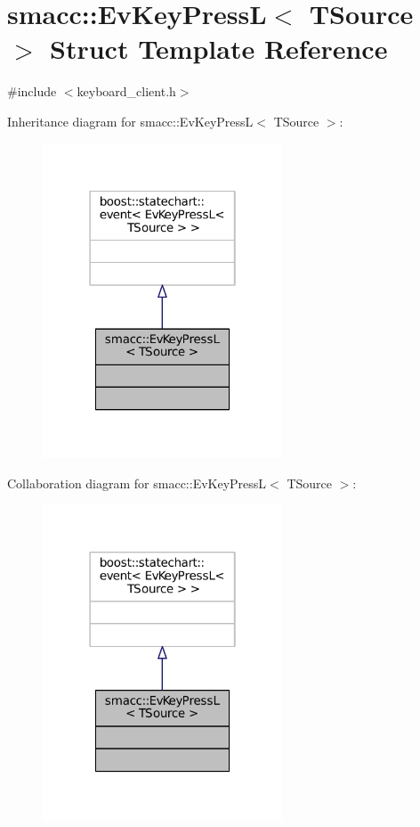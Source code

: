 \hypertarget{structsmacc_1_1EvKeyPressL}{}\section{smacc\+:\+:Ev\+Key\+PressL$<$ T\+Source $>$ Struct Template Reference}
\label{structsmacc_1_1EvKeyPressL}


{\ttfamily \#include $<$keyboard\+\_\+client.\+h$>$}



Inheritance diagram for smacc\+:\+:Ev\+Key\+PressL$<$ T\+Source $>$\+:
\nopagebreak
\begin{figure}[H]
\begin{center}
\leavevmode
\includegraphics[width=202pt]{structsmacc_1_1EvKeyPressL__inherit__graph}
\end{center}
\end{figure}


Collaboration diagram for smacc\+:\+:Ev\+Key\+PressL$<$ T\+Source $>$\+:
\nopagebreak
\begin{figure}[H]
\begin{center}
\leavevmode
\includegraphics[width=202pt]{structsmacc_1_1EvKeyPressL__coll__graph}
\end{center}
\end{figure}



